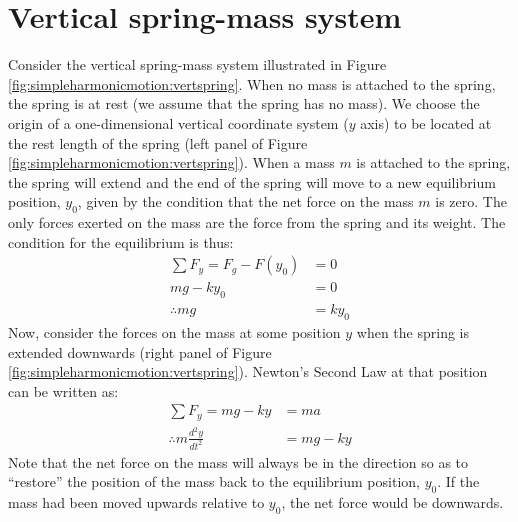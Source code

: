 \section{Vertical spring-mass system}
Consider the vertical spring-mass system illustrated in Figure \ref{fig:simpleharmonicmotion:vertspring}.
When no mass is attached to the spring, the spring is at rest (we assume that the spring has no mass). We choose the origin of a one-dimensional vertical coordinate system ($y$ axis) to be located at the rest length of the spring (left panel of Figure \ref{fig:simpleharmonicmotion:vertspring}). When a mass $m$ is attached to the spring, the spring will extend  and the end of the spring will move to a new equilibrium position, $y_0$, given by the condition that the net force on the mass $m$ is zero. The only forces exerted on the mass are the force from the spring and its weight. The condition for the equilibrium is thus:
\begin{align*}
\sum F_y = F_g - F(y_0) &=0\\
 mg - ky_0 &= 0 \\
 \therefore mg &= ky_0
\end{align*}
Now, consider the forces on the mass at some position $y$ when the spring is extended downwards (right panel of Figure \ref{fig:simpleharmonicmotion:vertspring}). Newton's Second Law at that position can be written as:
\begin{align*}
\sum F_y = mg - ky &= ma\\
\therefore m \frac{d^2y}{dt^2}& = mg - ky 
\end{align*}
Note that the net force on the mass will always be in the direction so as to ``restore'' the position of the mass back to the equilibrium position, $y_0$. If the mass had been moved upwards relative to $y_0$, the net force would be downwards.

